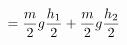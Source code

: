 \documentclass[preview]{standalone}
\begin{document}
\begin{align*}
\special{dvisvgm:raw <g id='unique000'>}= \frac{m}{2} g \frac{h_1}{2} + \frac{m}{2} g \frac{h_2}{2}\special{dvisvgm:raw </g>}
\end{align*}
\end{document}
